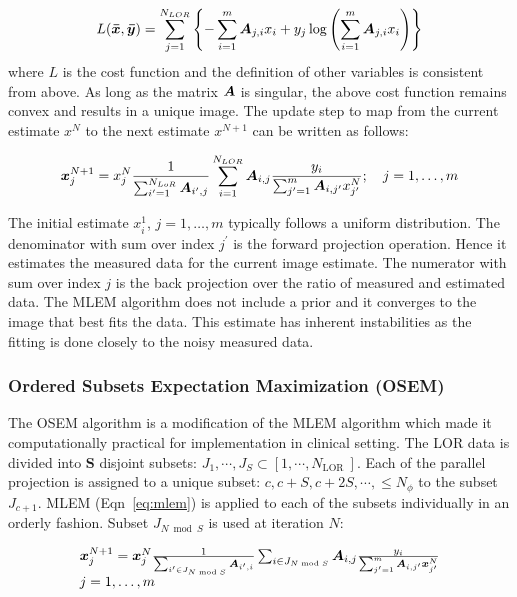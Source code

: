 \begin{equation}
L(\bm{\bar{x}}, \bm{\bar{y}})=\sum_{j=1}^{N_{L O R}}\left\{-\sum_{i=1}^{m} \bm{A}_{j, i} x_{i}+y_{j} \log \left(\sum_{i=1}^{m} \bm{A}_{j, i} x_{i}\right)\right\}
\end{equation}
where $L$ is the cost function and the definition of other variables is consistent from above. As long as the matrix $\bm{A}$ is singular, the above cost function remains convex and results in a unique image. 
The update step to map from the current estimate $x^{N}$ to the next estimate $x^{N+1}$ can be written as follows:

\begin{equation}\label{eq:mlem}
\bm{x}_{j}^{N+1}=x_{j}^{N} \frac{1}{\sum_{i^{\prime}=1}^{N_{L o R}} \bm{A}_{i^{\prime}, j}} \sum_{i=1}^{N_{L O R}} \bm{A}_{i,j} \frac{y_{i}}{\sum_{j^{\prime}=1}^{m} \bm{A}_{i, j^{\prime}} x_{j^{\prime}}^{N}}; \quad j=1, \ldots, m
\end{equation}

The initial estimate $x_i^{1}$, $j=1, \ldots, m$ typically follows a uniform distribution. The denominator with sum over index $j^{\prime}$ is the forward projection operation. Hence it estimates the measured data for the current image estimate. The numerator with sum over index $j$ is the back projection over the ratio of measured and estimated data. The \ac{MLEM} algorithm does not include a prior and it converges to the image that best fits the data. This estimate has inherent instabilities as the fitting is done closely to the noisy measured data. 


\subsubsection{Ordered Subsets Expectation Maximization (OSEM)}

The \ac{OSEM} algorithm is a modification of the \ac{MLEM} algorithm which made it computationally practical for implementation in clinical setting. The \ac{LOR} data is divided into $\bm{S}$ disjoint subsets: $J_{1}, \cdots, J_{S} \subset\left[1, \cdots, N_{\text {LOR }}\right]$. Each of the parallel projection is assigned to a unique subset: $c, c+S, c+2S, \cdots, \leq N_{\phi}$ to the subset $J_{c+1}$. \ac{MLEM} (Eqn~\ref{eq:mlem}) is applied to each of the subsets individually in an orderly fashion. Subset $J_{N\bmod S}$ is used at iteration $N$:

\begin{equation}
\begin{array}{l}
\bm{x}_{j}^{N+1}=\bm{x}_{j}^{N} \frac{1}{\sum_{i^{\prime} \in J_{N \bmod S}} \bm{A}_{i^{\prime}, i}} \sum_{i \in J_{N \bmod S}} \bm{A}_{i,j} \frac{y_{i}}{\sum_{j^{\prime}=1}^{m} \bm{A}_{i, j^{\prime}} \bm{x}_{j^{\prime}}^{N}} \\
j=1, \ldots, m
\end{array}
\end{equation}  

